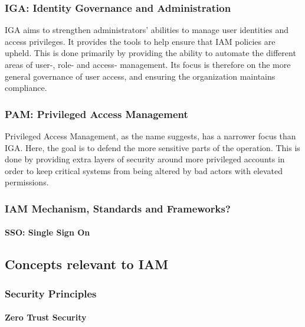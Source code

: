 \subsubsection{IGA: Identity Governance and Administration}
IGA aims to strengthen administrators' abilities to manage user identities and access privileges. It provides the tools to help ensure that IAM policies are upheld\citep{StrongDM-IGAvsPAM,CoreSec-DiffIAMIGAPAM}. This is done primarily by providing the ability to automate the different areas of user-, role- and access- management. Its focus is therefore on the more general governance of user access, and ensuring the organization maintains compliance.

\subsubsection{PAM: Privileged Access Management}
Privileged Access Management, as the name suggests, has a narrower focus than IGA. Here, the goal is to defend the more sensitive parts of the operation\citep{StrongDM-IGAvsPAM,CoreSec-DiffIAMIGAPAM}. This is done by providing extra layers of security around more privileged accounts in order to keep critical systems from being altered by bad actors with elevated permissions.
\subsubsection{IAM Mechanism, Standards and Frameworks?}
\paragraph{SSO: Single Sign On}
\subsection{Concepts relevant to IAM}
\subsubsection{Security Principles}
\paragraph{Zero Trust Security}

